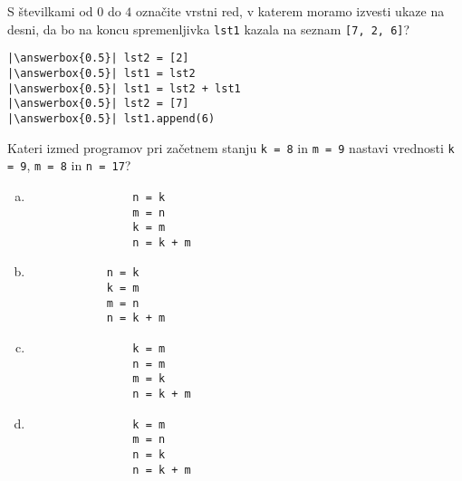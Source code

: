 \documentclass[arhiv, 10pt]{../izpit}
\newcommand{\inlinepy}[1]{\texttt{#1}}
\newcommand{\answerbox}[1]{\framebox{\vphantom{\large M}\hspace{#1cm}}}
\begin{document}
        \naloga*
        \begin{multicols}{2}
        \noindent 
        S številkami od $0$ do $4$ označite vrstni red, v katerem moramo izvesti ukaze na desni, da bo na koncu spremenljivka \inlinepy{lst1} kazala na seznam \inlinepy{[7, 2, 6]}?
    
        \columnbreak
        \noindent
        \begin{verbatim}
|\answerbox{0.5}| lst2 = [2]
|\answerbox{0.5}| lst1 = lst2
|\answerbox{0.5}| lst1 = lst2 + lst1
|\answerbox{0.5}| lst2 = [7]
|\answerbox{0.5}| lst1.append(6)

        \end{verbatim}
        \end{multicols}
    
            
        \naloga*
        
        Kateri izmed programov pri začetnem stanju
            \inlinepy{k = 8} in
            \inlinepy{m = 9}
        nastavi vrednosti
            \inlinepy{k = 9},
            \inlinepy{m = 8} in
            \inlinepy{n = 17}?
    
        \begin{multicols}{4}
        \begin{enumerate}[(a)]
\item 
                \begin{verbatim}
                n = k
                m = n
                k = m
                n = k + m
                \end{verbatim}
            
\item 
            \begin{verbatim}
            n = k
            k = m
            m = n
            n = k + m
            \end{verbatim}
        
\item 
                \begin{verbatim}
                k = m
                n = m
                m = k
                n = k + m
                \end{verbatim}
            
\item 
                \begin{verbatim}
                k = m
                m = n
                n = k
                n = k + m
                \end{verbatim}
            
\end{enumerate}

        \end{multicols}
    
\end{document}
